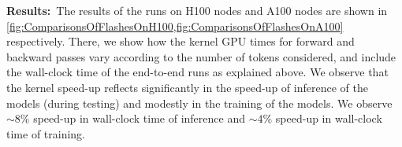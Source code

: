 \noindent\textbf{Results:}\ The results of the runs on H100 nodes and A100 nodes are shown in \cref{fig:ComparisonsOfFlashesOnH100,fig:ComparisonsOfFlashesOnA100} respectively.
There, we show how the kernel GPU times for forward and backward passes vary according to the number of tokens considered, and include the wall-clock time of the end-to-end runs as explained above. 
We observe that the kernel speed-up reflects significantly in the speed-up of inference of the models (during testing) and modestly in the training of the models.
We observe $\sim8\%$ speed-up in wall-clock time of inference and $\sim4\%$ speed-up in wall-clock time of training. 
\begin{table}[htbp]
    \tiny
    \centering
    \begin{sc}
\end{sc}
\end{table}
